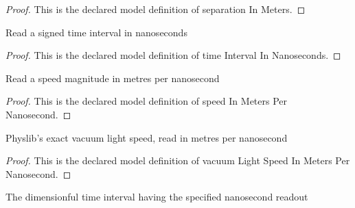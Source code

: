 \begin{proof}
  This is the declared model definition of separation In Meters.
\end{proof}
\begin{definition}
  \label{def:physics:phyx-mini-0592:phyxminiproblems-problemphyxmini0592-timeintervalinnanoseconds}
  Read a signed time interval in nanoseconds
\end{definition}
\begin{proof}
  This is the declared model definition of time Interval In Nanoseconds.
\end{proof}
\begin{definition}
  \label{def:physics:phyx-mini-0592:phyxminiproblems-problemphyxmini0592-speedinmeterspernanosecond}
  Read a speed magnitude in metres per nanosecond
\end{definition}
\begin{proof}
  This is the declared model definition of speed In Meters Per Nanosecond.
\end{proof}
\begin{definition}
  \label{def:physics:phyx-mini-0592:phyxminiproblems-problemphyxmini0592-vacuumlightspeedinmeterspernanosecond}
  Physlib's exact vacuum light speed, read in metres per nanosecond
\end{definition}
\begin{proof}
  This is the declared model definition of vacuum Light Speed In Meters Per Nanosecond.
\end{proof}
\begin{definition}
  \label{def:physics:phyx-mini-0592:phyxminiproblems-problemphyxmini0592-timeintervalofnanoseconds}
  The dimensionful time interval having the specified nanosecond readout
\end{definition}
